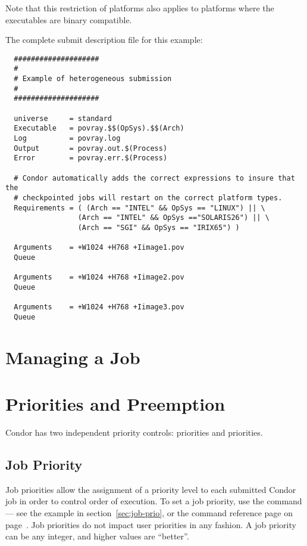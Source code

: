 Note that this restriction of platforms also applies to platforms where
the executables are binary compatible.

The complete submit description file for this example:

\begin{verbatim}
  ####################
  #
  # Example of heterogeneous submission
  #
  ####################

  universe     = standard
  Executable   = povray.$$(OpSys).$$(Arch)
  Log          = povray.log
  Output       = povray.out.$(Process)
  Error        = povray.err.$(Process)

  # Condor automatically adds the correct expressions to insure that the
  # checkpointed jobs will restart on the correct platform types.
  Requirements = ( (Arch == "INTEL" && OpSys == "LINUX") || \
                 (Arch == "INTEL" && OpSys =="SOLARIS26") || \
                 (Arch == "SGI" && OpSys == "IRIX65") )

  Arguments    = +W1024 +H768 +Iimage1.pov
  Queue 

  Arguments    = +W1024 +H768 +Iimage2.pov
  Queue 

  Arguments    = +W1024 +H768 +Iimage3.pov
  Queue 
\end{verbatim}

\section{Managing a Job}


\section{\label{sec:Priorities}Priorities and Preemption}

Condor has two independent priority controls: 
priorities and  priorities.  

\subsection{Job Priority}

Job priorities allow the assignment of a priority level to
each submitted Condor job in order to
control order of execution.
To set a job priority, use the  command
--- see the example in section~\ref{sec:job-prio}, or the
command reference page on page~\pageref{man-condor-prio}.
Job priorities do not impact user priorities in any fashion.
A job priority can be any integer, and higher values are ``better''.

